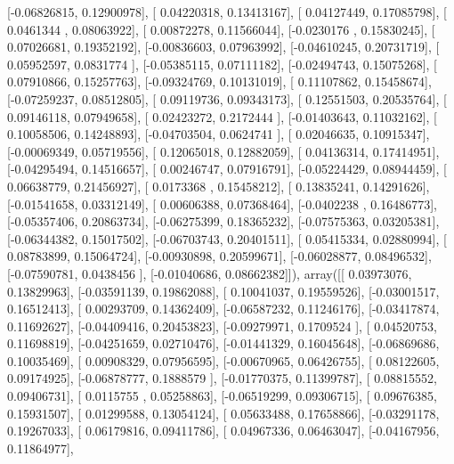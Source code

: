 \documentclass{article}
\begin{document}
       [-0.06826815,  0.12900978],
       [ 0.04220318,  0.13413167],
       [ 0.04127449,  0.17085798],
       [ 0.0461344 ,  0.08063922],
       [ 0.00872278,  0.11566044],
       [-0.0230176 ,  0.15830245],
       [ 0.07026681,  0.19352192],
       [-0.00836603,  0.07963992],
       [-0.04610245,  0.20731719],
       [ 0.05952597,  0.0831774 ],
       [-0.05385115,  0.07111182],
       [-0.02494743,  0.15075268],
       [ 0.07910866,  0.15257763],
       [-0.09324769,  0.10131019],
       [ 0.11107862,  0.15458674],
       [-0.07259237,  0.08512805],
       [ 0.09119736,  0.09343173],
       [ 0.12551503,  0.20535764],
       [ 0.09146118,  0.07949658],
       [ 0.02423272,  0.2172444 ],
       [-0.01403643,  0.11032162],
       [ 0.10058506,  0.14248893],
       [-0.04703504,  0.0624741 ],
       [ 0.02046635,  0.10915347],
       [-0.00069349,  0.05719556],
       [ 0.12065018,  0.12882059],
       [ 0.04136314,  0.17414951],
       [-0.04295494,  0.14516657],
       [ 0.00246747,  0.07916791],
       [-0.05224429,  0.08944459],
       [ 0.06638779,  0.21456927],
       [ 0.0173368 ,  0.15458212],
       [ 0.13835241,  0.14291626],
       [-0.01541658,  0.03312149],
       [ 0.00606388,  0.07368464],
       [-0.0402238 ,  0.16486773],
       [-0.05357406,  0.20863734],
       [-0.06275399,  0.18365232],
       [-0.07575363,  0.03205381],
       [-0.06344382,  0.15017502],
       [-0.06703743,  0.20401511],
       [ 0.05415334,  0.02880994],
       [ 0.08783899,  0.15064724],
       [-0.00930898,  0.20599671],
       [-0.06028877,  0.08496532],
       [-0.07590781,  0.0438456 ],
       [-0.01040686,  0.08662382]]), array([[ 0.03973076,  0.13829963],
       [-0.03591139,  0.19862088],
       [ 0.10041037,  0.19559526],
       [-0.03001517,  0.16512413],
       [ 0.00293709,  0.14362409],
       [-0.06587232,  0.11246176],
       [-0.03417874,  0.11692627],
       [-0.04409416,  0.20453823],
       [-0.09279971,  0.1709524 ],
       [ 0.04520753,  0.11698819],
       [-0.04251659,  0.02710476],
       [-0.01441329,  0.16045648],
       [-0.06869686,  0.10035469],
       [ 0.00908329,  0.07956595],
       [-0.00670965,  0.06426755],
       [ 0.08122605,  0.09174925],
       [-0.06878777,  0.1888579 ],
       [-0.01770375,  0.11399787],
       [ 0.08815552,  0.09406731],
       [ 0.0115755 ,  0.05258863],
       [-0.06519299,  0.09306715],
       [ 0.09676385,  0.15931507],
       [ 0.01299588,  0.13054124],
       [ 0.05633488,  0.17658866],
       [-0.03291178,  0.19267033],
       [ 0.06179816,  0.09411786],
       [ 0.04967336,  0.06463047],
       [-0.04167956,  0.11864977],
\end{document}
